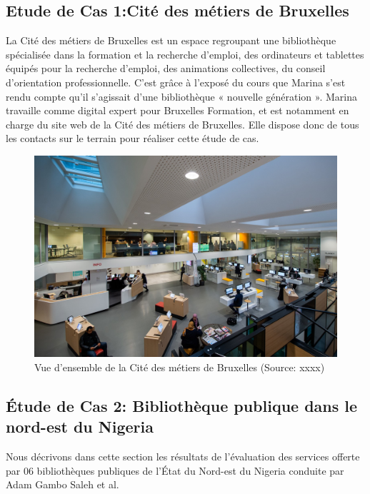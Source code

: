 \documentclass[french,a4paper,12pt]{article}
\begin{document}
\subsection{Etude de Cas 1:Cité des métiers de Bruxelles }
\quad La Cité des métiers de Bruxelles est un espace regroupant une bibliothèque spécialisée dans la formation et la recherche d'emploi, des ordinateurs et tablettes équipés pour la recherche d'emploi, des animations collectives, du conseil d'orientation professionnelle. C'est grâce à l'exposé du cours que Marina s'est rendu compte qu'il s'agissait d'une bibliothèque « nouvelle génération ». Marina travaille comme digital expert pour Bruxelles Formation, et est notamment en charge du site web de la Cité des métiers de Bruxelles. Elle dispose donc de tous les contacts sur le terrain pour réaliser cette étude de cas.
\begin{figure}[h]
\begin{center}

\includegraphics[scale=1]{imarina.JPG}
\caption{Vue d'ensemble de la Cité des métiers de Bruxelles (Source: xxxx)}
\end{center}
\end{figure}


\newpage
\subsection{Étude de Cas 2: Bibliothèque publique dans le nord-est du Nigeria \citep{Saleh}}
\quad Nous décrivons dans cette section les résultats de l'évaluation des services offerte par 06 bibliothèques publiques de l'État du Nord-est du Nigeria conduite par Adam Gambo Saleh et al. \\
\end{document}
